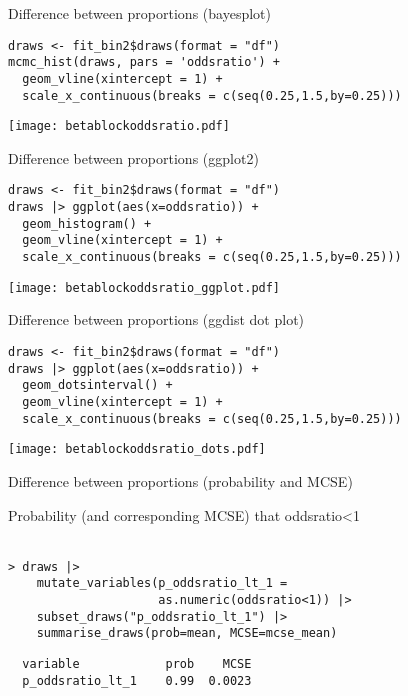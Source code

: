 \documentclass[finnish,english,t]{beamer}
\begin{document}
\begin{frame}[fragile]{Difference between proportions (bayesplot)}
  
  {\small
\begin{verbatim}
draws <- fit_bin2$draws(format = "df")
mcmc_hist(draws, pars = 'oddsratio') +
  geom_vline(xintercept = 1) +
  scale_x_continuous(breaks = c(seq(0.25,1.5,by=0.25)))
\end{verbatim}
  }

  \begin{center}
  \texttt{[image: betablockoddsratio.pdf]}
\end{center}
\end{frame}

\begin{frame}[fragile]{Difference between proportions (ggplot2)}

  \vspace{-0.5\baselineskip}
  {\small
\begin{verbatim}
draws <- fit_bin2$draws(format = "df")
draws |> ggplot(aes(x=oddsratio)) +
  geom_histogram() +
  geom_vline(xintercept = 1) +
  scale_x_continuous(breaks = c(seq(0.25,1.5,by=0.25)))
\end{verbatim}
  }

  \begin{center}
  \texttt{[image: betablockoddsratio\_ggplot.pdf]}
\end{center}
\end{frame}

\begin{frame}[fragile]{Difference between proportions (ggdist dot plot)}
  
  \vspace{-0.5\baselineskip}
  {\small
\begin{verbatim}
draws <- fit_bin2$draws(format = "df")
draws |> ggplot(aes(x=oddsratio)) +
  geom_dotsinterval() +
  geom_vline(xintercept = 1) +
  scale_x_continuous(breaks = c(seq(0.25,1.5,by=0.25)))
\end{verbatim}
  }

  \begin{center}
  \texttt{[image: betablockoddsratio\_dots.pdf]}
\end{center}
\end{frame}

\begin{frame}[fragile]{Difference between proportions (probability and MCSE)}

  Probability (and corresponding MCSE) that oddsratio<1
  \\~
  
{\small
\begin{verbatim}
> draws |>
    mutate_variables(p_oddsratio_lt_1 =
                     as.numeric(oddsratio<1)) |>
    subset_draws("p_oddsratio_lt_1") |>
    summarise_draws(prob=mean, MCSE=mcse_mean)
\end{verbatim}
\begin{verbatim}
  variable            prob    MCSE
  p_oddsratio_lt_1    0.99  0.0023
\end{verbatim}
  }

\end{frame}
\end{document}
